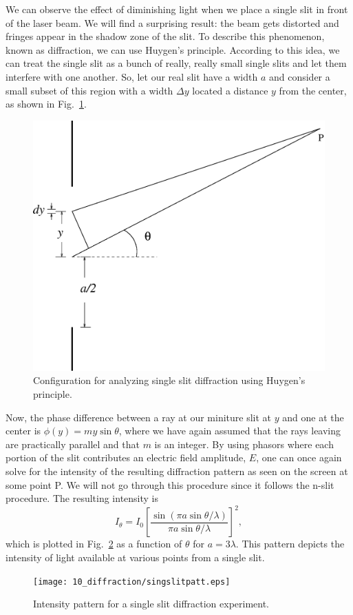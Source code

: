 We can observe the effect of diminishing light when we place a 
single slit in front of the laser beam.  We will find a surprising
result: the beam gets distorted and fringes appear in 
the shadow zone of the slit.
To describe this phenomenon, known as diffraction, we can use Huygen's 
principle. According to this idea, we can treat the single slit as a bunch of
really, really small single slits and let them interfere with one another. So,
let our real slit have a width $a$ and consider a small subset of this region
with a width $\Delta y$ located a distance $y$ from the center, as shown in 
Fig.~\ref{fig:diff:single slit diffraction}.
\begin{figure}[htb]
\centering 
\epsfxsize=8cm \includegraphics[scale=0.6]{10_diffraction/singlediff.eps}
\caption{Configuration for analyzing single slit diffraction using Huygen's
principle.}
\label{fig:diff:single slit diffraction}
\end{figure}
Now, the phase difference between a ray at  our miniture slit at $y$ and one at
the center is $\phi(y)  = m y \sin \theta$, where we have again 
assumed that the rays leaving are practically parallel and that 
$m$ is an integer.
By using phasors where each portion of the slit contributes an electric
field amplitude, $E$, one can once again solve for the 
intensity of the resulting
diffraction pattern as seen on the screen at some point P.  We will not go
through this procedure since it follows the n-slit procedure.
The resulting intensity is
\begin{equation}
I_{\theta} = I_0 \left [ \frac{\sin (\pi a \sin \theta / \lambda )}
{\pi a \sin \theta / \lambda}\right] ^2,
\label{eqn:diff:singleI}
\end{equation}  
which is plotted in Fig.~\ref{fig:diff:singlediffI} as a function of 
$\theta$ for $a = 3 \lambda$.  This pattern depicts
the intensity of light available at various points from a single slit.
\begin{figure}[htb]
\centering 
\epsfxsize=8cm \texttt{[image: 10\_diffraction/singslitpatt.eps]}
\caption{Intensity pattern for a single slit diffraction experiment.}
\label{fig:diff:singlediffI}
\end{figure}

